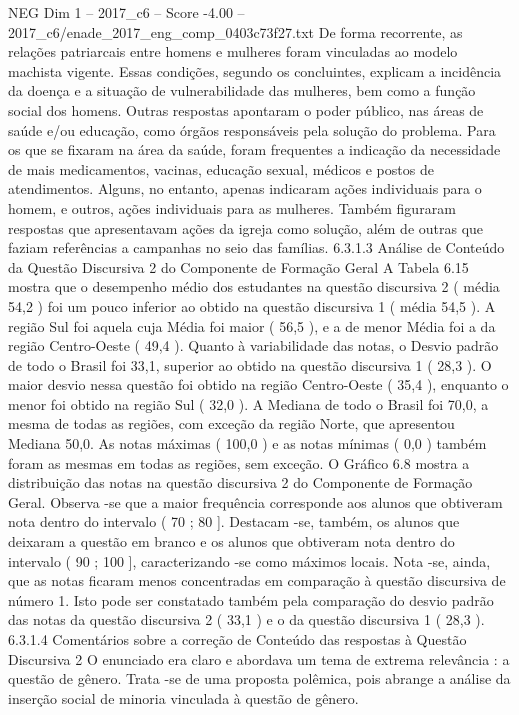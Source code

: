 \begin{textsample}{NEG Dim 1 – 2017\_c6 – Score -4.00 – 2017\_c6/enade\_2017\_eng\_comp\_0403c73f27.txt}
De forma recorrente, as relações patriarcais entre homens e mulheres foram vinculadas ao modelo machista vigente.
Essas condições, segundo os concluintes, explicam a incidência da doença e a situação de vulnerabilidade das mulheres, bem como a função social dos homens.
Outras respostas apontaram o poder público, nas áreas de saúde e/ou educação, como órgãos responsáveis pela solução do problema.
Para os que se fixaram na área da saúde, foram frequentes a indicação da necessidade de mais medicamentos, vacinas, educação sexual, médicos e postos de atendimentos.
Alguns, no entanto, apenas indicaram ações individuais para o homem, e outros, ações individuais para as mulheres.
Também figuraram respostas que apresentavam ações da igreja como solução, além de outras que faziam referências a campanhas no seio das famílias. 6.3.1.3 Análise de Conteúdo da Questão Discursiva 2 do Componente de Formação Geral A Tabela 6.15 mostra que o desempenho médio dos estudantes na questão discursiva 2 ( média 54,2 ) foi um pouco inferior ao obtido na questão discursiva 1 ( média 54,5 ).
A região Sul foi aquela cuja Média foi maior ( 56,5 ), e a de menor Média foi a da região Centro-Oeste ( 49,4 ).
Quanto à variabilidade das notas, o Desvio padrão de todo o Brasil foi 33,1, superior ao obtido na questão discursiva 1 ( 28,3 ).
O maior desvio nessa questão foi obtido na região Centro-Oeste ( 35,4 ), enquanto o menor foi obtido na região Sul ( 32,0 ).
A Mediana de todo o Brasil foi 70,0, a mesma de todas as regiões, com exceção da região Norte, que apresentou Mediana 50,0.
As notas máximas ( 100,0 ) e as notas mínimas ( 0,0 ) também foram as mesmas em todas as regiões, sem exceção.
O Gráfico 6.8 mostra a distribuição das notas na questão discursiva 2 do Componente de Formação Geral.
Observa -se que a maior frequência corresponde aos alunos que obtiveram nota dentro do intervalo ( 70 ; 80 ].
Destacam -se, também, os alunos que deixaram a questão em branco e os alunos que obtiveram nota dentro do intervalo ( 90 ; 100 ], caracterizando -se como máximos locais.
Nota -se, ainda, que as notas ficaram menos concentradas em comparação à questão discursiva de número 1.
Isto pode ser constatado também pela comparação do desvio padrão das notas da questão discursiva 2 ( 33,1 ) e o da questão discursiva 1 ( 28,3 ). 6.3.1.4 Comentários sobre a correção de Conteúdo das respostas à Questão Discursiva 2 O enunciado era claro e abordava um tema de extrema relevância : a questão de gênero.
Trata -se de uma proposta polêmica, pois abrange a análise da inserção social de minoria vinculada à questão de gênero.

\end{textsample}
